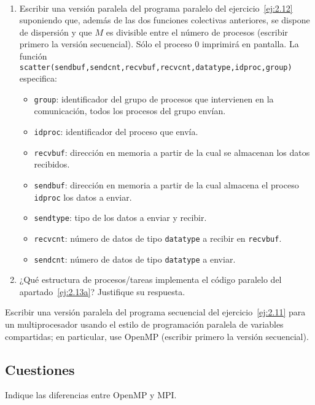 \begin{ejercicio}~
    \begin{enumerate}
        \item\label{ej:2.13a} Escribir una versión paralela del programa paralelo del ejercicio~\ref{ej:2.12} suponiendo que, además de las
        dos funciones colectivas anteriores, se dispone de dispersión y que $M$ es divisible entre el número de
        procesos (escribir primero la versión secuencial). Sólo el proceso 0 imprimirá en pantalla. La función
        \verb|scatter(sendbuf,sendcnt,recvbuf,recvcnt,datatype,idproc,group)| especifica:
        \begin{itemize}
            \item \verb|group|: identificador del grupo de procesos que intervienen en la comunicación, todos los procesos
            del grupo envían.
            \item \verb|idproc|: identificador del proceso que envía.
            \item \verb|recvbuf|: dirección en memoria a partir de la cual se almacenan los datos recibidos.
            \item \verb|sendbuf|: dirección en memoria a partir de la cual almacena el proceso \verb|idproc| los datos a enviar.
            \item \verb|sendtype|: tipo de los datos a enviar y recibir.
            \item \verb|recvcnt|: número de datos de tipo \verb|datatype| a recibir en \verb|recvbuf|.
            \item \verb|sendcnt|: número de datos de tipo \verb|datatype| a enviar.
        \end{itemize}

        \item ¿Qué estructura de procesos/tareas implementa el código paralelo del apartado~\ref{ej:2.13a}? Justifique su respuesta.
    \end{enumerate}
\end{ejercicio}

\begin{ejercicio}
    Escribir una versión paralela del programa secuencial del ejercicio~\ref{ej:2.11} para un multiprocesador
    usando el estilo de programación paralela de variables compartidas; en particular, use OpenMP (escribir
    primero la versión secuencial).
\end{ejercicio}

\subsection{Cuestiones}
\begin{cuestion}
    Indique las diferencias entre OpenMP y MPI.
\end{cuestion}

